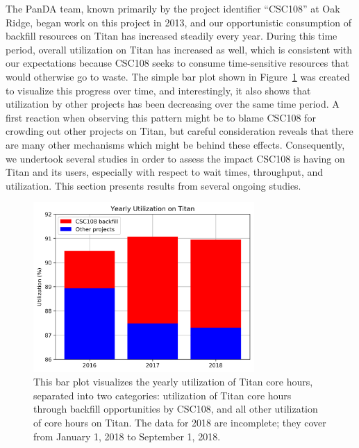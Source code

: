 The PanDA team, known primarily by the project identifier ``CSC108'' at Oak
Ridge, began work on this project in 2013, and our opportunistic consumption of
backfill resources on Titan has increased steadily every year. During this time
period, overall utilization on Titan has increased as well, which is consistent
with our expectations because CSC108 seeks to consume time-sensitive resources
that would otherwise go to waste. The simple bar plot shown in
Figure~\ref{fig:jacks-slide} was created to visualize this progress over time,
and interestingly, it also shows that utilization by other projects has been
decreasing over the same time period. A first reaction when observing this
pattern might be to blame CSC108 for crowding out other projects on Titan, but
careful consideration reveals that there are many other mechanisms which might
be behind these effects. Consequently, we undertook several studies in order to
assess the impact CSC108 is having on Titan and its users, especially with
respect to wait times, throughput, and utilization. This section presents
results from several ongoing studies.

\begin{figure}
  \includegraphics[width=0.75\textwidth]{images/barplot-jacks-slide.png}
\caption{This bar plot visualizes the yearly utilization of Titan core hours,
separated into two categories: utilization of Titan core hours through backfill
opportunities by CSC108, and all other utilization of core hours on Titan. The
data for 2018 are incomplete; they cover from January 1, 2018 to September 1,
2018.}
\label{fig:jacks-slide}
\end{figure}


